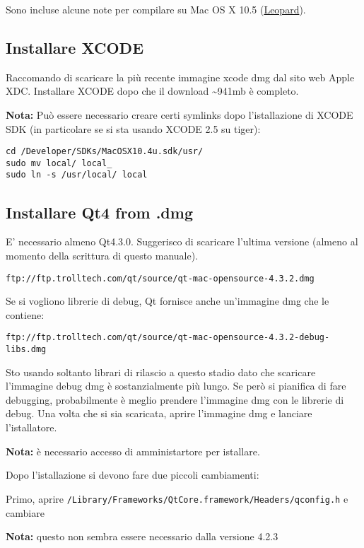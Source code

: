 Sono incluse alcune note per compilare su Mac OS X 10.5 (\underline{Leopard}).

\subsection{Installare XCODE}
Raccomando di scaricare la più recente immagine xcode dmg dal sito web Apple XDC. Installare XCODE dopo che il download \~{}941mb è completo.

\textbf{Nota:} Può essere necessario creare certi symlinks dopo l'istallazione di XCODE SDK (in particolare se si sta usando XCODE 2.5 su tiger):

\begin{verbatim}
cd /Developer/SDKs/MacOSX10.4u.sdk/usr/
sudo mv local/ local_
sudo ln -s /usr/local/ local
\end{verbatim}

\subsection{Installare Qt4 from .dmg}
E' necessario almeno Qt4.3.0. Suggerisco di scaricare l'ultima versione (almeno al momento della scrittura di questo manuale).

\begin{verbatim}
ftp://ftp.trolltech.com/qt/source/qt-mac-opensource-4.3.2.dmg
\end{verbatim}

Se si vogliono librerie di debug, Qt fornisce anche un'immagine dmg che le contiene:

\begin{verbatim}
ftp://ftp.trolltech.com/qt/source/qt-mac-opensource-4.3.2-debug-libs.dmg
\end{verbatim}

Sto usando soltanto librari di rilascio a questo stadio dato che scaricare l'immagine debug dmg è sostanzialmente più lungo. Se però si pianifica di fare debugging, probabilmente è meglio prendere l'immagine dmg con le librerie di debug. Una volta che si sia scaricata, aprire l'immagine dmg e lanciare l'istallatore.

\textbf{Nota:} è necessario accesso di amministartore per istallare.

Dopo l'istallazione si devono fare due piccoli cambiamenti:

Primo, aprire \texttt{/Library/Frameworks/QtCore.framework/Headers/qconfig.h} e cambiare

\textbf{Nota:} questo non sembra essere necessario dalla versione 4.2.3

